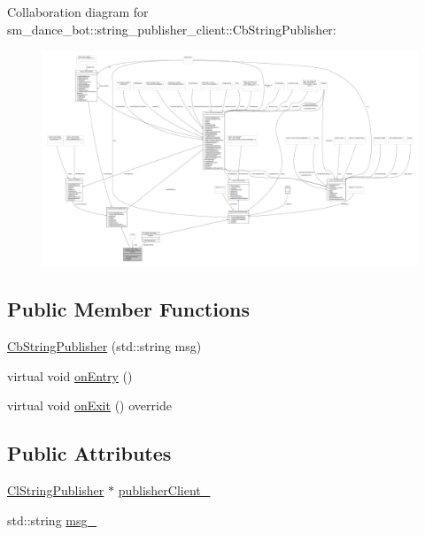 Collaboration diagram for sm\+\_\+dance\+\_\+bot\+:\+:string\+\_\+publisher\+\_\+client\+:\+:Cb\+String\+Publisher\+:
\nopagebreak
\begin{figure}[H]
\begin{center}
\leavevmode
\includegraphics[width=350pt]{classsm__dance__bot_1_1string__publisher__client_1_1CbStringPublisher__coll__graph}
\end{center}
\end{figure}
\subsection*{Public Member Functions}
\begin{DoxyCompactItemize}
\item 
\hyperlink{classsm__dance__bot_1_1string__publisher__client_1_1CbStringPublisher_adf09d1ab9b2107f3c084bbe19f1a1d3e}{Cb\+String\+Publisher} (std\+::string msg)
\item 
virtual void \hyperlink{classsm__dance__bot_1_1string__publisher__client_1_1CbStringPublisher_aa5ecb93a5548cfeeb7c103c9f0009c3a}{on\+Entry} ()
\item 
virtual void \hyperlink{classsm__dance__bot_1_1string__publisher__client_1_1CbStringPublisher_ae999bf03223ac330d47dee542d259b72}{on\+Exit} () override
\end{DoxyCompactItemize}
\subsection*{Public Attributes}
\begin{DoxyCompactItemize}
\item 
\hyperlink{classsm__dance__bot_1_1string__publisher__client_1_1ClStringPublisher}{Cl\+String\+Publisher} $\ast$ \hyperlink{classsm__dance__bot_1_1string__publisher__client_1_1CbStringPublisher_ab193cff488df923ffc0fcc1939c487f5}{publisher\+Client\+\_\+}
\item 
std\+::string \hyperlink{classsm__dance__bot_1_1string__publisher__client_1_1CbStringPublisher_a838e820800dd07fdf1179735fe727b12}{msg\+\_\+}
\end{DoxyCompactItemize}


